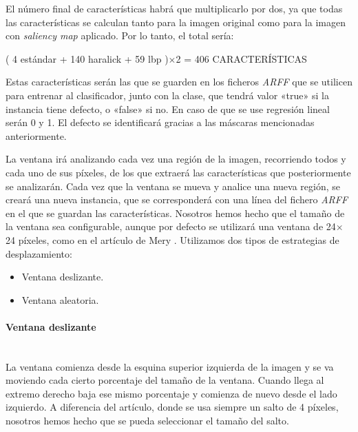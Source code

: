 El número final de características habrá que multiplicarlo por dos, ya que todas las características se calculan tanto para la imagen original como para la imagen con \emph{saliency map} aplicado. Por lo tanto, el total sería:

\begin{center}
( 4 estándar + 140 haralick + 59 lbp )$\times$2 = 406 CARACTERÍSTICAS
\end{center}

Estas características serán las que se guarden en los ficheros \textit{ARFF} que se utilicen para entrenar
al clasificador, junto con la clase, que tendrá valor «true» si la instancia tiene defecto, o «false» si
no. En caso de que se use regresión lineal serán 0 y 1. El defecto se identificará gracias a las máscaras mencionadas anteriormente.

La ventana irá analizando cada vez una región de la imagen, recorriendo todos y cada uno de sus píxeles, de los que extraerá las características que posteriormente se analizarán. Cada vez que la ventana se mueva y analice una nueva región, se creará una nueva instancia, que se corresponderá con una línea del fichero \textit{ARFF} en el que se guardan las características. Nosotros hemos hecho que el tamaño de la ventana sea configurable, aunque por defecto se utilizará una ventana de 24$\times$24 píxeles, como en el artículo de Mery \cite{DomingoMery}. Utilizamos dos tipos de estrategias de desplazamiento:

\begin{itemize}
\item Ventana deslizante.
\item Ventana aleatoria.
\end{itemize}

\paragraph*{Ventana deslizante}\mbox{} \\
\indent La ventana comienza desde la esquina superior izquierda de la imagen y se va moviendo cada cierto porcentaje del tamaño de la ventana. Cuando llega al extremo derecho baja ese mismo porcentaje y comienza de nuevo desde el lado izquierdo. A diferencia del artículo, donde se usa siempre un salto de 4 píxeles, nosotros hemos hecho que se pueda seleccionar el tamaño del salto.


